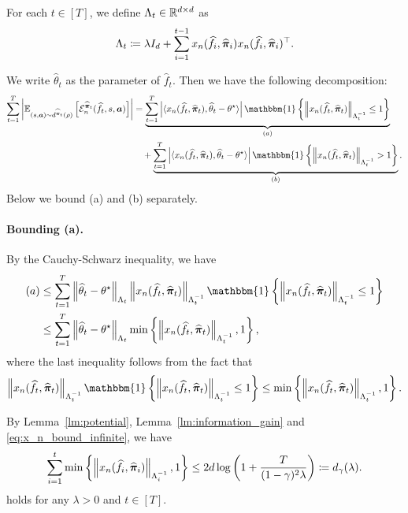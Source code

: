 For each $t\in[T]$, we define $\Lambda_t\in\mathbb{R}^{d\times d}$ as
\begin{align}\label{eq:Lambda_mg_infinite}
\Lambda_t\coloneqq \lambda I_d + \sum_{i=1}^{t-1} x_n(\widehat{f}_i,\widehat{{\bm{\pi}}}_i)x_n(\widehat{f}_i,\widehat{{\bm{\pi}}}_i)^\top.
\end{align}




We write $\widehat{\theta}_t$ as the parameter of $\widehat{f}_t$.
Then we have the following decomposition:
\begin{align}\label{eq:bound_sum_gE_infinite}
    \sum_{t=1}^T \left| \E_{(s,\va)\sim d^{\widehat{\vpi}_t}(\rho)}\left[\gE_n^{\widehat{\vpi}_t}(\widehat{f}_t,s,\va)\right]\right|&= \underbrace{\sum_{t=1}^T \left| \langle x_n(\widehat{f}_t,\widehat{\vpi}_t),\widehat{\theta}_t-\theta^\star\rangle\right|\mathbbm{1}\left\{\norm{x_n(\widehat{f}_t,\widehat{\vpi}_t)}_{\Lambda_{t}^{-1}}\leq 1\right\}}_{(a)}\notag\\
& \quad + \underbrace{\sum_{t=1}^T \left| \langle x_n(\widehat{f}_t,\widehat{\vpi}_t),\widehat{\theta}_t-\theta^\star\rangle\right|\mathbbm{1}\left\{\norm{x_n(\widehat{f}_t,\widehat{\vpi}_t)}_{\Lambda_{t}^{-1}}> 1\right\}}_{(b)}.
\end{align}
Below we bound (a) and (b) separately.

\paragraph{Bounding (a).}

By the Cauchy-Schwarz inequality, we have
\begin{align}\label{eq:bound_sum_gE_infinite_2}
    (a) &\leq \sum_{t=1}^T \norm{\widehat{\theta}_t-\theta^\star}_{\Lambda_t}\norm{x_n(\widehat{f}_t,\widehat{\vpi}_t)}_{\Lambda_{t}^{-1}}\mathbbm{1}\left\{\norm{x_n(\widehat{f}_t,\widehat{\vpi}_t)}_{\Lambda_{t}^{-1}}\leq 1\right\}\notag\\
    &\leq \sum_{t=1}^T \norm{\widehat{\theta}_t-\theta^\star}_{\Lambda_t}\min\left\{ \norm{x_n(\widehat{f}_t,\widehat{\vpi}_t)}_{\Lambda_{t}^{-1}},1\right\},
\end{align}
where the last inequality follows from the fact that
$$\norm{x_n(\widehat{f}_t,\widehat{\vpi}_t)}_{\Lambda_{t}^{-1}}\mathbbm{1}\left\{\norm{x_n(\widehat{f}_t,\widehat{\vpi}_t)}_{\Lambda_{t}^{-1}}\leq 1\right\}\leq \min\left\{ \norm{x_n(\widehat{f}_t,\widehat{\vpi}_t)}_{\Lambda_{t}^{-1}},1\right\}.$$

By Lemma~\ref{lm:potential}, Lemma~\ref{lm:information_gain} and \eqref{eq:x_n_bound_infinite}, we have
\begin{align}\label{eq:|x|_bound_mg_infinite}
\sum_{i=1}^t \min\left\{ \left\| x_n(\widehat{f}_i,\widehat{{\bm{\pi}}}_i) \right\|_{\Lambda_{i}^{-1}},1\right\}\leq 2d\log\left(1+\frac{T}{(1-\gamma)^2\lambda}\right)\coloneqq d_\gamma(\lambda).
\end{align}
holds for any $\lambda>0$ and $t\in[T]$.

